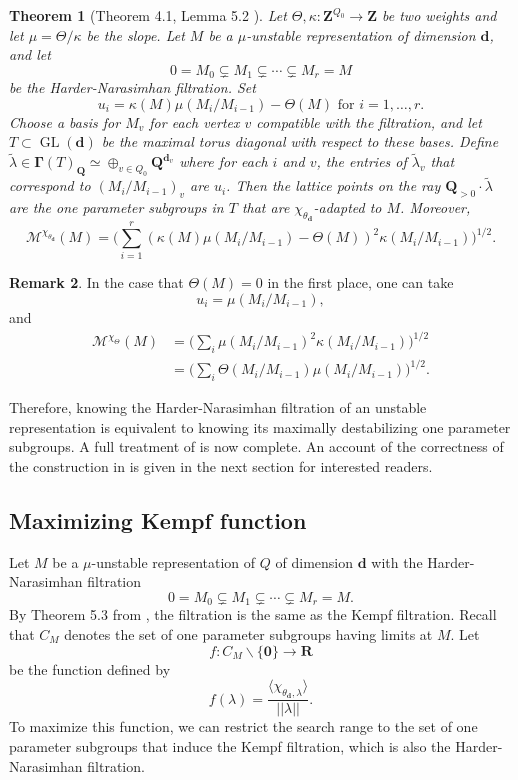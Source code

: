 \documentclass[a4paper]{amsart}
\numberwithin{equation}{section}
\theoremstyle{plain}
\newtheorem{theorem}{Theorem}[section]
\theoremstyle{definition}
\newtheorem{remark}[theorem]{Remark}
\DeclareMathOperator{\GL}{GL}
\begin{document}
\begin{theorem}[Theorem 4.1, Lemma 5.2 \cite{MR3199484}]\label{one_PS_via_Kempf's_filtration}
Let $\Theta,\kappa:\mathbf{Z}^{Q_0}\rightarrow\mathbf{Z}$ be two weights and let $\mu=\Theta/\kappa$ be the slope.  Let $M$ be a $\mu$-unstable representation of dimension $\mathbf{d}$, and let $$0=M_0\subsetneq M_1\subsetneq \cdots\subsetneq M_r=M$$ be the Harder-Narasimhan filtration. Set $$u_i=\kappa(M)\mu(M_{i}/M_{i-1})-\Theta(M)\text{ for }i=1,\ldots,r.$$ Choose a basis for $M_{v}$ for each vertex $v$ compatible with the filtration, and let $T\subset \GL(\mathbf{d})$ be the maximal torus diagonal with respect to these bases. Define $\tilde{\lambda}\in\pmb{\Gamma}(T)_{\mathbf{Q}}\simeq\oplus_{v\in Q_0}\mathbf{Q}^{\mathbf{d}_v}$ where for each $i$ and $v$, the entries of $\tilde{\lambda}_v$ that correspond to $(M_i/M_{i-1})_v$ are $u_i$. Then the lattice points on the ray $\mathbf{Q}_{>0}\cdot \tilde{\lambda}$ are the one parameter subgroups in $T$ that are $\chi_{\theta_{\mathbf{d}}}$-adapted to $M$. Moreover, $$\mathcal{M}^{\chi_{\theta_{\mathbf{d}}}}(M)=\big(\sum_{i=1}^r(\kappa(M)\mu(M_{i}/M_{i-1})-\Theta(M))^2\kappa(M_i/M_{i-1})\big)^{1/2} .$$ 
\end{theorem}
\begin{remark}\label{one_PS_via_Kempf's_filtration_simpli_version}
In the case that $\Theta(M)=0$ in the first place, one can take $$u_i=\mu(M_i/M_{i-1}),$$ and \begin{equation*}\begin{split}
\mathcal{M}^{\chi_{\Theta}}(M)&=\big(\sum_{i}\mu(M_{i}/M_{i-1})^2\kappa(M_{i}/M_{i-1})\big)^{1/2}\\
&=\big(\sum_{i}\Theta(M_{i}/M_{i-1})\mu(M_{i}/M_{i-1})\big)^{1/2}.\end{split}\end{equation*}\end{remark}

Therefore, knowing the Harder-Narasimhan filtration of an unstable representation is equivalent to knowing its  maximally destabilizing one parameter subgroups. A full treatment of  is now complete. An account of the correctness of the construction in  is given in the next section for interested readers.
\subsection{Maximizing Kempf function}\label{maximizing_Kempf_function}
Let $M$ be a $\mu$-unstable representation of $Q$ of dimension $\mathbf{d}$ with the Harder-Narasimhan filtration 
$$0=M_0\subsetneq M_1\subsetneq\cdots\subsetneq M_r=M.$$ By Theorem 5.3 from \cite{MR3199484}, the filtration is the same as the Kempf filtration. Recall that $C_M$ denotes the set of one parameter subgroups having limits at $M$. Let $$f:C_M\backslash\{\mathbf{0}\}\rightarrow\mathbf{R}$$ be the function defined by $$f(\lambda)=\frac{\langle\chi_{\theta_{\mathbf{d}},\lambda}\rangle}{||\lambda||}.$$ To maximize this function, we can restrict the search range to the set of one parameter subgroups that induce the Kempf filtration, which is also the Harder-Narasimhan filtration. 
\end{document}
